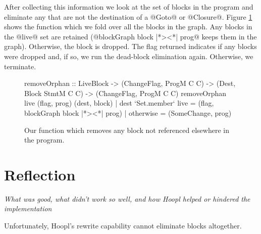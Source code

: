 \documentclass[12pt]{report}
\begin{document}
After collecting this information we look at the set of blocks in the
program and eliminate any that are not the destination of a @Goto@ or
@Closure@. Figure \ref{ref_figure_removeOrphan} shows the function
which we fold over all the blocks in the graph. Any blocks in the
@live@ set are retained (@blockGraph block |*><*| prog@ keeps them in
the graph). Otherwise, the block is dropped. The flag returned
indicates if any blocks were dropped and, if so, we run the dead-block
elimination again. Otherwise, we terminate.

\begin{figure}[h]
  \begin{code}
    removeOrphan :: LiveBlock 
                 -> (ChangeFlag, ProgM C C) 
                 -> (Dest, Block StmtM C C) 
                 -> (ChangeFlag, ProgM C C)
    removeOrphan live (flag, prog) (dest, block) 
      | dest `Set.member` live = (flag, blockGraph block |*><*| prog)
      | otherwise = (SomeChange, prog)
  \end{code}
  \caption{Our function which removes any block not referenced elsewhere in the program.}
  \label{ref_figure_removeOrphan}
\end{figure}

\section{Reflection}
\emph{What was good, what didn't work so well, and how Hoopl helped
or hindered the implementation}

Unfortunately, Hoopl's rewrite capability cannot eliminate
blocks altogether. 
\end{document}
